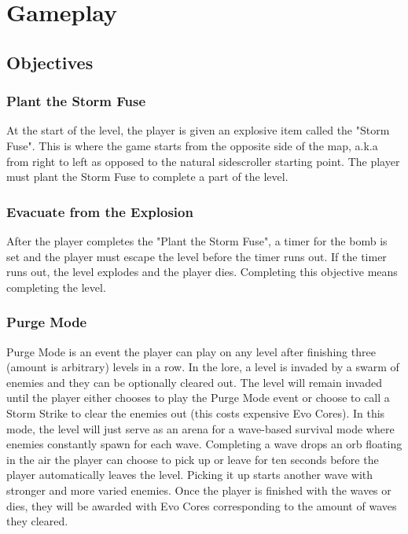 \documentclass[12pt]{article}
\begin{document}
\section{Gameplay}

\subsection{Objectives}

\subsubsection{Plant the Storm Fuse}

At the start of the level, the player is given an explosive item called the "Storm Fuse". This is where the game starts from the  opposite side of the map, a.k.a from right to left as opposed to the natural sidescroller starting point. The player must plant the Storm Fuse to complete a part of the level. 

\subsubsection{Evacuate from the Explosion}

After the player completes the "Plant the Storm Fuse", a timer for the bomb is set and the player must escape the level before the timer runs out. If the timer runs out, the level explodes and the player dies. Completing this objective means completing the level. 

\subsubsection{Purge Mode}

Purge Mode is an event the player can play on any level after finishing three (amount is arbitrary) levels in a row. In the lore, a level is invaded by a swarm of enemies and they can be optionally cleared out. The level will remain invaded until the player either chooses to play the Purge Mode event or choose to call a Storm Strike to clear the enemies out (this costs expensive Evo Cores). In this mode, the level will just serve as an arena for a wave-based survival mode where enemies constantly spawn for each wave. Completing a wave drops an orb floating in the air the player can choose to pick up or leave for ten seconds before the player automatically leaves the level. Picking it up starts another wave with stronger and more varied enemies. Once the player is finished with the waves or dies, they will be awarded with Evo Cores corresponding to the amount of waves they cleared.
\end{document}
